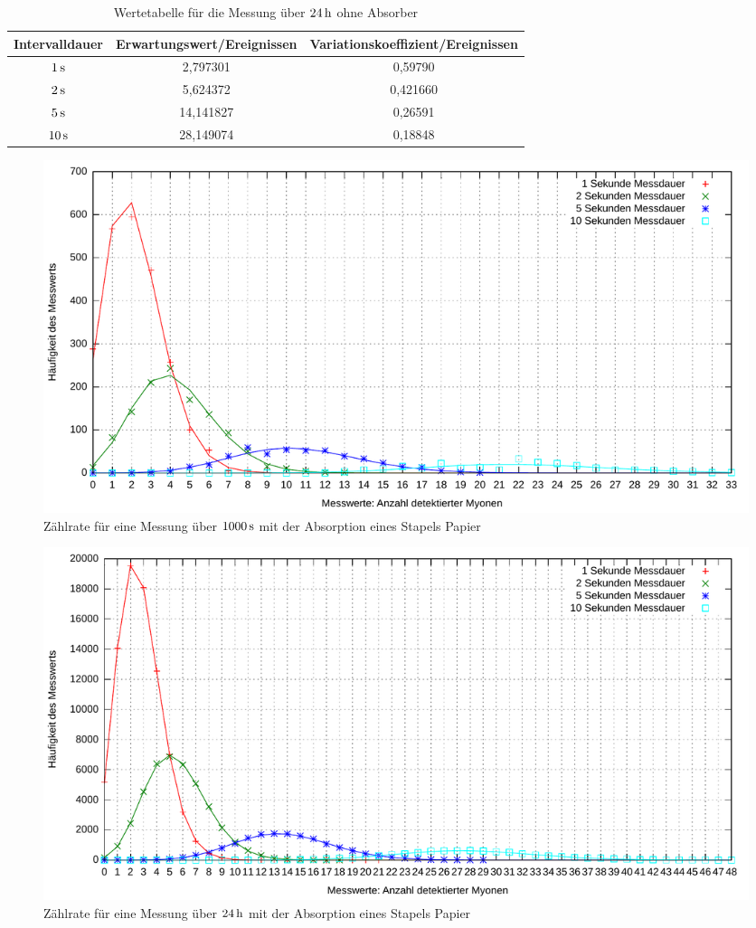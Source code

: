 \documentclass[numbers=noenddot,12pt,a4paper]{scrartcl}
\begin{document}
\begin{table}[H]
	\centering
	\begin{tabular}{c|c|c}
		Intervalldauer & Erwartungswert/Ereignissen & Variationskoeffizient/Ereignissen \\ \hline
		$\unit[1]{s}$ & 2,797301 & 0,59790 \\ \hline
		$\unit[2]{s}$ & 5,624372 & 0,421660 \\ \hline
		$\unit[5]{s}$ & 14,141827 & 0,26591 \\ \hline
		$\unit[10]{s}$ & 28,149074 & 0,18848
	\end{tabular}
	\caption{Wertetabelle für die Messung über $\unit[24]{h}$ ohne Absorber}\label{tab:zweitertag}
\end{table}
\begin{figure}[H]
	\centering
	\includegraphics[width=\textwidth]{messwerte/histo1000s.pdf}
	\caption{Zählrate für eine Messung über $\unit[1000]{s}$ mit der Absorption eines Stapels Papier}\label{img:zähl1000}
\end{figure}
\begin{figure}[H]
	\centering
	\includegraphics[width=\textwidth]{messwerte/histoerstertag.pdf}
	\caption{Zählrate für eine Messung über $\unit[24]{h}$ mit der Absorption eines Stapels Papier}\label{img:zählerster}
\end{figure}
\end{document}
